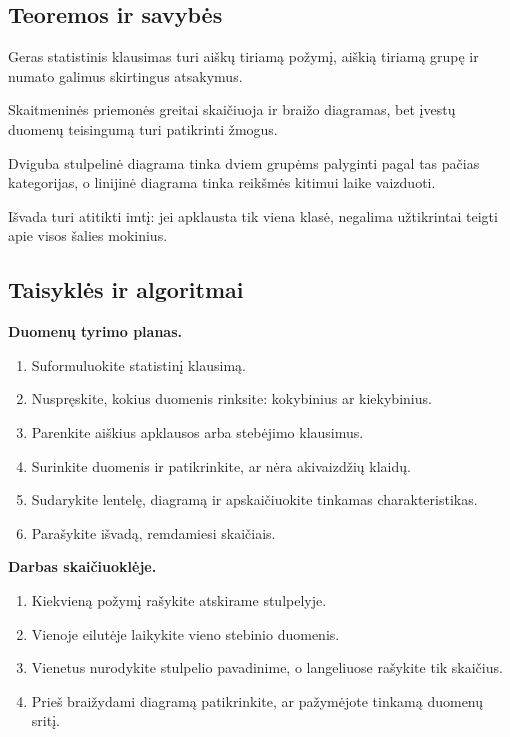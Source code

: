 \subsection{Teoremos ir savybės}
\begin{savybe}
Geras statistinis klausimas turi aiškų tiriamą požymį, aiškią tiriamą grupę ir numato galimus skirtingus atsakymus.
\end{savybe}
\begin{savybe}
Skaitmeninės priemonės greitai skaičiuoja ir braižo diagramas, bet įvestų duomenų teisingumą turi patikrinti žmogus.
\end{savybe}
\begin{savybe}
Dviguba stulpelinė diagrama tinka dviem grupėms palyginti pagal tas pačias kategorijas, o linijinė diagrama tinka reikšmės kitimui laike vaizduoti.
\end{savybe}
\begin{savybe}
Išvada turi atitikti imtį: jei apklausta tik viena klasė, negalima užtikrintai teigti apie visos šalies mokinius.
\end{savybe}

\subsection{Taisyklės ir algoritmai}
\textbf{Duomenų tyrimo planas.}
\begin{enumerate}[label=\arabic*.]
\item Suformuluokite statistinį klausimą.
\item Nuspręskite, kokius duomenis rinksite: kokybinius ar kiekybinius.
\item Parenkite aiškius apklausos arba stebėjimo klausimus.
\item Surinkite duomenis ir patikrinkite, ar nėra akivaizdžių klaidų.
\item Sudarykite lentelę, diagramą ir apskaičiuokite tinkamas charakteristikas.
\item Parašykite išvadą, remdamiesi skaičiais.
\end{enumerate}

\textbf{Darbas skaičiuoklėje.}
\begin{enumerate}[label=\arabic*.]
\item Kiekvieną požymį rašykite atskirame stulpelyje.
\item Vienoje eilutėje laikykite vieno stebinio duomenis.
\item Vienetus nurodykite stulpelio pavadinime, o langeliuose rašykite tik skaičius.
\item Prieš braižydami diagramą patikrinkite, ar pažymėjote tinkamą duomenų sritį.
\end{enumerate}

